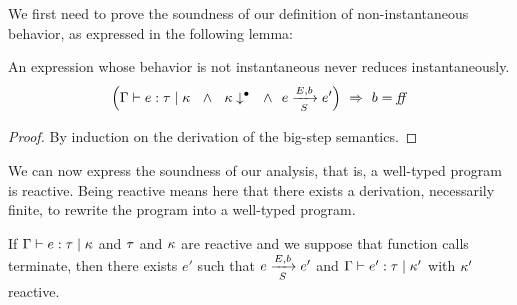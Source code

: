 \documentclass[9pt,preprint]{sigplanconf}
\begin{document}
We first need to prove the soundness of our definition of non-instantaneous behavior, as expressed in the following lemma:
\begin{lemma}
\label{lem:noinst}
An expression whose behavior is not instantaneous never reduces instantaneously.
\[
\left( \tyju{\tyenv}{e}{\rt}{\rk}
 \ \ \land\ \  \noinst{\rk} \ \ \land\ \  \bigstep{N}{e}{e'} {E}{b}{S}  \right) \ \Rightarrow\  b = \sfalse \]
\end{lemma}
\begin{proof}
By induction on the derivation of the big-step semantics.
\end{proof}

We can now express the soundness of our analysis, that is, a well-typed program is reactive. Being reactive means here that there exists a derivation, necessarily finite, to rewrite the program into a well-typed program.
\begin{theorem}[Soundness]
\label{thm:soundness}
If \mbox{$\tyju{\tyenv}{e}{\rt}{\rk}$} and $\rt$ and $\rk$ are reactive and we suppose that function calls terminate, then there exists $e'$ such that \mbox{$\bigstep{N}{e}{e'} {E}{b}{S}$} and \mbox{$\tyju{\tyenv}{e'}{\rt}{\rk'}$} with $\rk'$ reactive.
\end{theorem}
\end{document}
